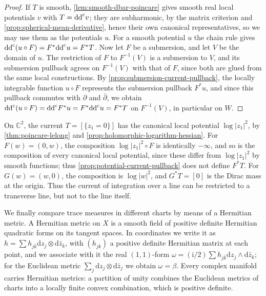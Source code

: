 \begin{proof}
If $T$ is smooth, \cref{lem:smooth-dbar-poincare} gives smooth real local potentials $v$ with $T=\mathrm{dd}^{\mathrm{c}} v$; they are subharmonic, by the matrix criterion and \cref{prop:spherical-mean-derivative}, hence their own canonical representatives, so we may use them as the potentials $u$. For a smooth potential $u$ the chain rule gives $\mathrm{dd}^{\mathrm{c}}(u\circ F)=F^*\mathrm{dd}^{\mathrm{c}} u=F^*T$. Now let $F$ be a submersion, and let $V$ be the domain of $u$. The restriction of $F$ to $F^{-1}(V)$ is a submersion to $V$, and its submersion pullback agrees on $F^{-1}(V)$ with that of $F$, since both are glued from the same local constructions. By \cref{prop:submersion-current-pullback}, the locally integrable function $u\circ F$ represents the submersion pullback $F^*u$, and since this pullback commutes with $\partial$ and $\bar\partial$, we obtain $\mathrm{dd}^{\mathrm{c}}(u\circ F)=\mathrm{dd}^{\mathrm{c}} F^*u=F^*\mathrm{dd}^{\mathrm{c}} u=F^*T$ on $F^{-1}(V)$, in particular on $W$.
\end{proof}

\begin{example}\label{ex:undefined-pole-pullback}
On $\mathbb{C}^2$, the current $T=[\{z_1=0\}]$ has the canonical local potential $\log|z_1|^2$, by \cref{thm:poincare-lelong} and \cref{prop:holomorphic-logarithm-hessian}. For $F(w)=(0,w)$, the composition $\log|z_1|^2\circ F$ is identically $-\infty$, and so is the composition of every canonical local potential, since these differ from $\log|z_1|^2$ by smooth functions; thus \cref{prop:potential-current-pullback} does not define $F^*T$. For $G(w)=(w,0)$, the composition is $\log|w|^2$, and $G^*T=[0]$ is the Dirac mass at the origin. Thus the current of integration over a line can be restricted to a transverse line, but not to the line itself.
\end{example}

We finally compare trace measures in different charts by means of a Hermitian metric. A Hermitian metric on $X$ is a smooth field of positive definite Hermitian quadratic forms on its tangent spaces. In coordinates we write it as $h=\sum h_{j\bar k}\mathrm{d}z_j\otimes\mathrm{d}\bar z_k$, with $(h_{j\bar k})$ a positive definite Hermitian matrix at each point, and we associate with it the real $(1,1)$-form $\omega=(\mathrm{i}/2)\sum h_{j\bar k}\mathrm{d}z_j\wedge\mathrm{d}\bar z_k$; for the Euclidean metric $\sum_j\mathrm dz_j\otimes\mathrm d\bar z_j$ we obtain $\omega=\beta$. Every complex manifold carries Hermitian metrics: a partition of unity combines the Euclidean metrics of charts into a locally finite convex combination, which is positive definite.

